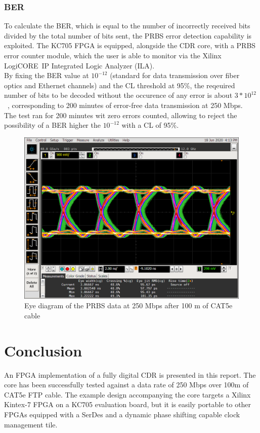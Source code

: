 \documentclass[11pt]{article}
\renewcommand{\>}{\rangle} \renewcommand{\emptyset}{\varnothing}
\begin{document}
\subsubsection{BER}
To calculate the BER, which is equal to the number of incorrectly received bits
divided by the total number of bits sent, the PRBS error detection capability is
exploited. The KC705 FPGA is equipped, alongside the CDR core, with a PRBS error
counter module, which the user is able to monitor via the Xilinx
LogiCORE\texttrademark~IP Integrated Logic Analyzer (ILA).\\
By fixing the BER value at $10^{-12}$ (standard for data transmission over fiber
optics and Ethernet channels) and the CL threshold at 95\%, the reqeuired number
of bits to be decoded without the occurence of any error is about $3 *
10^{12}$~\cite{ref:ber}, corresponding to 200 minutes of error-free data
transmission at 250
Mbps.\\
The test ran for 200 minutes wit zero errors counted, allowing to reject the
possibility of a BER higher the $10^{-12}$ with a CL of 95\%.
\begin{figure}[H]
  \centerline{\includegraphics[width=0.6\linewidth]{images/eye_width}}
  \caption{Eye diagram of the PRBS data at 250 Mbps after 100 m of CAT5e cable}
  \label{fig:eye}
\end{figure}

\section{Conclusion}
An FPGA implementation of a fully digital CDR is presented in this report. The
core has been successfully tested against a data rate of 250 Mbps over 100m of
CAT5e FTP cable. The example design accompanying the core targets a Xilinx
Kintex-7 FPGA on a KC705 evaluation board, but it is easily portable to other
FPGAs equipped with a SerDes and a dynamic phase shifting capable clock
management tile.
\end{document}

